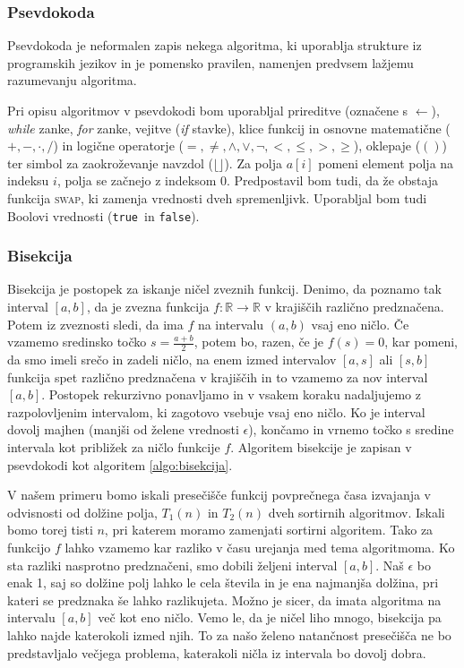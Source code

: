 \documentclass[a4paper,oneside,12pt]{article}
\def\R{\mathbb R}
\def\False{\texttt{false}}
\def\True{\texttt{true}}
\begin{document}
\subsubsection{Psevdokoda}
Psevdokoda je neformalen zapis nekega algoritma, ki uporablja strukture iz programskih
jezikov in je pomensko pravilen, namenjen predvsem lažjemu razumevanju algoritma.

Pri opisu algoritmov v psevdokodi bom uporabljal prireditve (označene s $\gets$), 
\emph{while} zanke, \emph{for} zanke, vejitve (\emph{if} stavke), klice 
funkcij in osnovne  matematične ($+, -, \cdot, /$) in logične operatorje ($=, 
\neq, \wedge, \vee, \neg, <, \leq, >, \geq$), oklepaje ($()$) ter simbol za zaokroževanje
navzdol ($\lfloor\rfloor$). 
Za polja $a[i]$ pomeni element polja na indeksu $i$, polja se začnejo z indeksom $0$.
Predpostavil bom tudi, da že obstaja funkcija \textsc{swap}, ki zamenja vrednosti dveh
spremenljivk. Uporabljal bom tudi Boolovi vrednosti (\True\ in \False).
\subsubsection{Bisekcija}
Bisekcija je postopek za iskanje ničel zveznih funkcij. Denimo, da poznamo tak interval $[a, b]$,
da je zvezna funkcija $f\!\!: \R \rightarrow \R$ v krajiščih različno predznačena.
Potem iz zveznosti sledi, da ima $f$ na
intervalu $(a, b)$ vsaj eno ničlo. Če vzamemo sredinsko točko $s = \frac{a + b}{2}$, potem bo, razen,
če je $f(s) = 0$, kar pomeni, da smo imeli srečo in zadeli ničlo, na enem izmed intervalov $[a, s]$
ali $[s, b]$ funkcija spet različno predznačena v krajiščih in to vzamemo za nov interval $[a, b]$. 
Postopek rekurzivno ponavljamo in v vsakem koraku nadaljujemo z razpolovljenim intervalom,
ki zagotovo vsebuje vsaj eno ničlo. Ko je interval dovolj majhen (manjši od želene vrednosti $\epsilon$), končamo in vrnemo točko s
sredine intervala kot približek za ničlo funkcije $f$. Algoritem bisekcije je zapisan v psevdokodi kot 
algoritem \ref{algo:bisekcija}.

V našem primeru bomo iskali presečišče funkcij povprečnega časa izvajanja v odvisnosti od dolžine polja, $T_1(n)$ in 
$T_2(n)$ dveh sortirnih algoritmov. Iskali bomo torej tisti $n$, pri katerem moramo zamenjati sortirni algoritem. 
Tako za funkcijo $f$ lahko vzamemo kar razliko v času urejanja med tema algoritmoma.
Ko sta razliki nasprotno predznačeni,
smo dobili željeni interval $[a, b]$. Naš $\epsilon$ bo enak 1, saj so dolžine polj lahko le cela števila
in je ena najmanjša dolžina, pri kateri se predznaka še lahko razlikujeta.
Možno je sicer, da imata algoritma na intervalu $[a, b]$ več kot eno ničlo. 
Vemo le, da je ničel liho mnogo, bisekcija pa lahko najde katerokoli izmed njih.
To za našo želeno natančnost presečišča ne bo predstavljalo večjega problema, katerakoli 
ničla iz intervala bo dovolj dobra.
\end{document}
